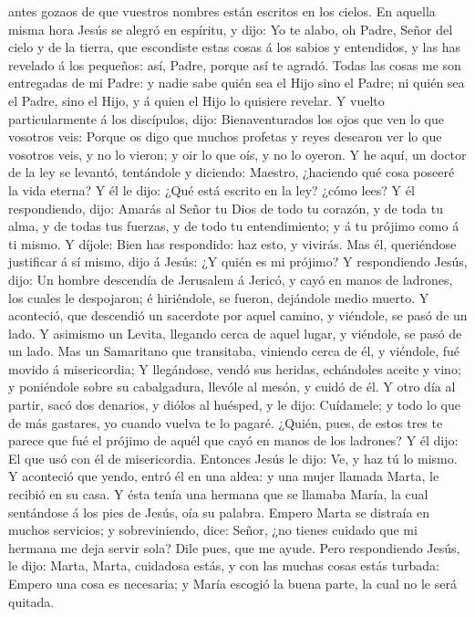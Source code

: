 antes gozaos de que vuestros nombres están escritos en los cielos.
 En aquella misma hora Jesús se alegró en espíritu, y dijo:
Yo te alabo, oh Padre, Señor del cielo y de la tierra, que escondiste
estas cosas á los sabios y entendidos, y las has revelado á los
pequeños: así, Padre, porque así te agradó.  Todas las
cosas me son entregadas de mi Padre: y nadie sabe quién sea el Hijo sino
el Padre; ni quién sea el Padre, sino el Hijo, y á quien el Hijo lo
quisiere revelar.  Y vuelto particularmente á los
discípulos, dijo: Bienaventurados los ojos que ven lo que vosotros veis:
 Porque os digo que muchos profetas y reyes desearon ver lo
que vosotros veis, y no lo vieron; y oir lo que oís, y no lo oyeron.
 Y he aquí, un doctor de la ley se levantó, tentándole y
diciendo: Maestro, ¿haciendo qué cosa poseeré la vida eterna?
 Y él le dijo: ¿Qué está escrito en la ley? ¿cómo lees?
 Y él respondiendo, dijo: Amarás al Señor tu Dios de todo
tu corazón, y de toda tu alma, y de todas tus fuerzas, y de todo tu
entendimiento; y á tu prójimo como á ti mismo.  Y díjole:
Bien has respondido: haz esto, y vivirás.  Mas él,
queriéndose justificar á sí mismo, dijo á Jesús: ¿Y quién es mi prójimo?
 Y respondiendo Jesús, dijo: Un hombre descendía de
Jerusalem á Jericó, y cayó en manos de ladrones, los cuales le
despojaron; é hiriéndole, se fueron, dejándole medio muerto.
 Y aconteció, que descendió un sacerdote por aquel camino,
y viéndole, se pasó de un lado.  Y asimismo un Levita,
llegando cerca de aquel lugar, y viéndole, se pasó de un lado.
 Mas un Samaritano que transitaba, viniendo cerca de él, y
viéndole, fué movido á misericordia;  Y llegándose, vendó
sus heridas, echándoles aceite y vino; y poniéndole sobre su
cabalgadura, llevóle al mesón, y cuidó de él.  Y otro día
al partir, sacó dos denarios, y diólos al huésped, y le dijo: Cuídamele;
y todo lo que de más gastares, yo cuando vuelva te lo pagaré.
 ¿Quién, pues, de estos tres te parece que fué el prójimo
de aquél que cayó en manos de los ladrones?  Y él dijo: El
que usó con él de misericordia. Entonces Jesús le dijo: Ve, y haz tú lo
mismo.  Y aconteció que yendo, entró él en una aldea: y una
mujer llamada Marta, le recibió en su casa.  Y ésta tenía
una hermana que se llamaba María, la cual sentándose á los pies de
Jesús, oía su palabra.  Empero Marta se distraía en muchos
servicios; y sobreviniendo, dice: Señor, ¿no tienes cuidado que mi
hermana me deja servir sola? Dile pues, que me ayude.  Pero
respondiendo Jesús, le dijo: Marta, Marta, cuidadosa estás, y con las
muchas cosas estás turbada:  Empero una cosa es necesaria;
y María escogió la buena parte, la cual no le será quitada.

